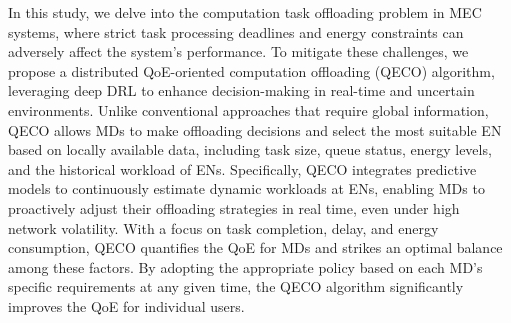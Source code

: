 \documentclass[10pt, journal,letterpaper]{IEEEtran}
\begin{document}
In this study, we delve into the computation task offloading problem in MEC systems, where strict task processing deadlines and energy constraints can adversely affect the system's performance. To mitigate these challenges, we propose a distributed QoE-oriented computation offloading (QECO) algorithm, leveraging deep DRL to enhance decision-making in real-time and uncertain environments. Unlike conventional approaches that require global information, QECO allows MDs to make offloading decisions and select the most suitable EN based on locally available data, including task size, queue status, energy levels, and the historical workload of ENs. Specifically, QECO integrates predictive models to continuously estimate dynamic workloads at ENs, enabling MDs to proactively adjust their offloading strategies in real time, even under high network volatility. With a focus on task completion, delay, and energy consumption, QECO quantifies the QoE for MDs and strikes an optimal balance among these factors. By adopting the appropriate policy based on each MD’s specific requirements at any given time, the QECO algorithm significantly improves the QoE for individual users.




\end{document}
